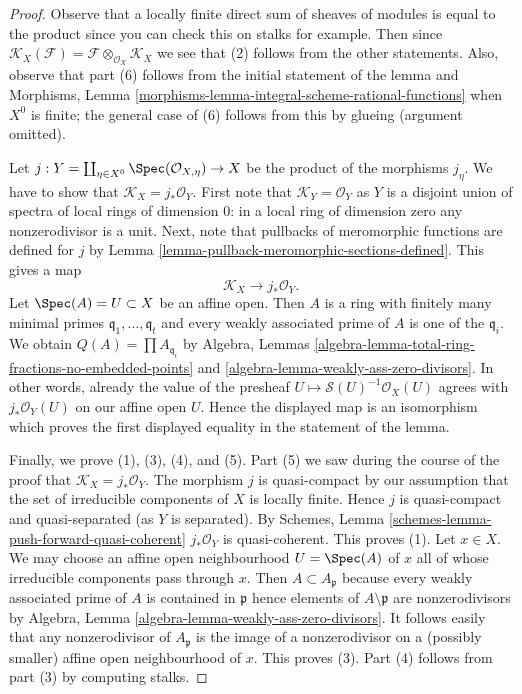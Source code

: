 \begin{proof}
Observe that a locally finite direct sum of sheaves of modules
is equal to the product since you can check this on stalks for
example. Then since $\mathcal{K}_X(\mathcal{F}) =
\mathcal{F} \otimes_{\mathcal{O}_X} \mathcal{K}_X$
we see that (2) follows from the other statements.
Also, observe that part (6) follows from the initial
statement of the lemma and Morphisms, Lemma
\ref{morphisms-lemma-integral-scheme-rational-functions}
when $X^0$ is finite; the general case of (6) follows from this
by glueing (argument omitted).

\medskip\noindent
Let $j : Y = \coprod\nolimits_{\eta \in X^0} \Spec(\mathcal{O}_{X, \eta}) \to X$
be the product of the morphisms $j_\eta$. We have to show that
$\mathcal{K}_X = j_*\mathcal{O}_Y$.
First note that $\mathcal{K}_Y = \mathcal{O}_Y$ as $Y$ is a disjoint
union of spectra of local rings of dimension $0$: in a local
ring of dimension zero any nonzerodivisor is a unit.
Next, note that pullbacks of meromorphic
functions are defined for $j$ by
Lemma \ref{lemma-pullback-meromorphic-sections-defined}.
This gives a map
$$
\mathcal{K}_X \longrightarrow j_*\mathcal{O}_Y.
$$
Let $\Spec(A) = U \subset X$ be an affine open. Then $A$ is a ring
with finitely many minimal primes $\mathfrak q_1, \ldots, \mathfrak q_t$
and every weakly associated prime of $A$ is one of the $\mathfrak q_i$.
We obtain $Q(A) = \prod A_{\mathfrak q_i}$
by Algebra, Lemmas \ref{algebra-lemma-total-ring-fractions-no-embedded-points}
and \ref{algebra-lemma-weakly-ass-zero-divisors}.
In other words, already the value of the presheaf
$U \mapsto \mathcal{S}(U)^{-1}\mathcal{O}_X(U)$ agrees with
$j_*\mathcal{O}_Y(U)$ on our affine open $U$. Hence the displayed
map is an isomorphism which proves the first displayed equality in
the statement of the lemma.

\medskip\noindent
Finally, we prove (1), (3), (4), and (5).
Part (5) we saw during the course of the proof that
$\mathcal{K}_X = j_*\mathcal{O}_Y$.
The morphism $j$ is quasi-compact by our assumption
that the set of irreducible components of $X$ is locally finite.
Hence $j$ is quasi-compact and quasi-separated (as $Y$ is separated).
By Schemes, Lemma \ref{schemes-lemma-push-forward-quasi-coherent}
$j_*\mathcal{O}_Y$ is quasi-coherent. This proves (1).
Let $x \in X$. We may choose an affine open neighbourhood
$U = \Spec(A)$ of $x$ all of whose irreducible components
pass through $x$. Then $A \subset A_\mathfrak p$ because every
weakly associated prime of $A$ is contained in $\mathfrak p$
hence elements of $A \setminus \mathfrak p$ are nonzerodivisors
by Algebra, Lemma \ref{algebra-lemma-weakly-ass-zero-divisors}.
It follows easily that any nonzerodivisor of $A_\mathfrak p$
is the image of a nonzerodivisor on a (possibly smaller)
affine open neighbourhood of $x$. This proves (3).
Part (4) follows from part (3) by computing stalks.
\end{proof}




